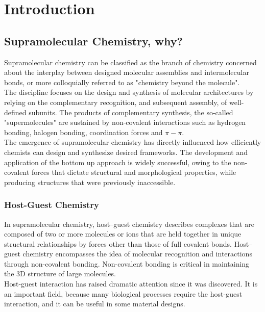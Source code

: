 \documentclass[../Master.tex]{subfiles}
\begin{document}
\chapter{Introduction}
\section{Supramolecular Chemistry, why?}\label{sec:supramolecular-chemistry}
Supramolecular chemistry can be classified as the branch of chemistry concerned about the interplay between designed molecular assemblies and intermolecular bonds, or more colloquially referred to as "chemistry beyond the molecule". \\
The discipline focuses on the design and synthesis of molecular architectures by relying on the complementary recognition, and subsequent assembly, of well-defined subunits. The products of complementary synthesis, the so-called "supermolecules" are sustained by non-covalent interactions such as hydrogen bonding, halogen bonding, coordination forces and \(\pi-\pi\). \\
The emergence of supramolecular chemistry has directly influenced how efficiently chemists can design and synthesize desired frameworks. The development and application of the bottom up approach is widely successful, owing to the non-covalent forces that dictate structural and morphological properties, while producing structures that were previously inaccessible.

\subsection{Host-Guest Chemistry}\label{subsec:host-guest-chemistry}
In supramolecular chemistry, host–guest chemistry describes complexes that are composed of two or more molecules or ions that are held together in unique structural relationships by forces other than those of full covalent bonds. Host–guest chemistry encompasses the idea of molecular recognition and interactions through non-covalent bonding. Non-covalent bonding is critical in maintaining the 3D structure of large molecules. \\
Host-guest interaction has raised dramatic attention since it was discovered. It is an important field, because many biological processes require the host-guest interaction, and it can be useful in some material designs.
\end{document}
